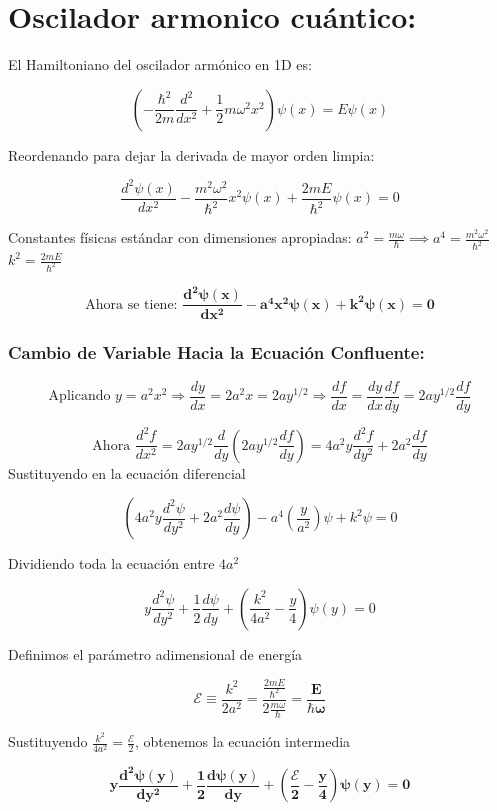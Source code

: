 \documentclass[12pt]{article}
\begin{document}
\section*{Oscilador armonico cuántico:}

El Hamiltoniano del oscilador armónico en 1D es:

$$\left( -\frac{\hbar^2}{2m} \frac{d^2}{dx^2} + \frac{1}{2}m\omega^2 x^2 \right) \psi(x) = E \psi(x)$$

Reordenando para dejar la derivada de mayor orden limpia:

$$\frac{d^2\psi(x)}{dx^2} - \frac{m^2\omega^2}{\hbar^2} x^2 \psi(x) + \frac{2mE}{\hbar^2} \psi(x) = 0$$

Constantes físicas estándar con dimensiones apropiadas:
$a^2 = \frac{m\omega}{\hbar} \implies a^4 = \frac{m^2\omega^2}{\hbar^2}$
$k^2 = \frac{2mE}{\hbar^2}$

$$\text{Ahora se tiene: } \mathbf{\frac{d^2\psi(x)}{dx^2} - a^4 x^2 \psi(x) + k^2 \psi(x) = 0}$$

\subsubsection*{Cambio de Variable Hacia la Ecuación Confluente:}

$$\text{Aplicando } y = a^2 x^2 \Rightarrow \frac{dy}{dx}=2a^2x=2ay^{1/2} \Rightarrow \frac{df}{dx}=\frac{dy}{dx}\frac{df}{dy}=2ay^{1/2}\frac{df}{dy}$$

$$\text{Ahora }\frac{d^2f}{dx^2} = 2ay^{1/2}\frac{d}{dy}(2ay^{1/2}\frac{df}{dy}) = 4a^2 y \frac{d^2f}{dy^2} + 2a^2 \frac{df}{dy}$$
Sustituyendo en la ecuación diferencial

$$\left( 4a^2 y \frac{d^2\psi}{dy^2} + 2a^2 \frac{d\psi}{dy} \right) - a^4 \left(\frac{y}{a^2}\right)\psi + k^2 \psi = 0$$

Dividiendo toda la ecuación entre $4a^2$

$$y \frac{d^2\psi}{dy^2} + \frac{1}{2} \frac{d\psi}{dy} + \left( \frac{k^2}{4a^2} - \frac{y}{4} \right) \psi(y) = 0$$

Definimos el parámetro adimensional de energía

$$\mathcal{E} \equiv \frac{k^2}{2a^2} = \frac{\frac{2mE}{\hbar^2}}{2\frac{m\omega}{\hbar}} = \mathbf{\frac{E}{\hbar\omega}}$$

Sustituyendo $\frac{k^2}{4a^2} = \frac{\mathcal{E}}{2}$, obtenemos la ecuación intermedia

$$\mathbf{y \frac{d^2\psi(y)}{dy^2} + \frac{1}{2} \frac{d\psi(y)}{dy} + \left( \frac{\mathcal{E}}{2} - \frac{y}{4} \right) \psi(y) = 0}$$
\end{document}
